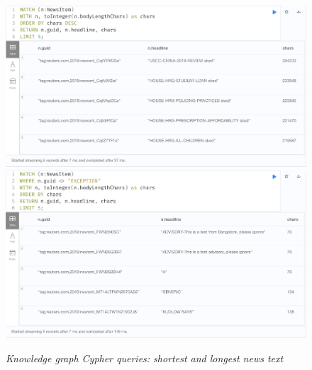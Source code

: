 \documentclass[11pt]{article}
\begin{document}
  \begin{figure}
    \includegraphics[scale=0.2]{01-longest-items}
    \includegraphics[scale=0.2]{01-shortest-items}
    \caption{\textit{Knowledge graph Cypher queries: shortest and longest news text}}
  \end{figure}
\end{document}
